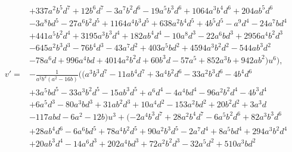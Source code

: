 \documentclass{gtpart}
\theoremstyle{definition}
\theoremstyle{remark}
\begin{document}
\begin{equation*}
\begin{split}
      & + 337 a^2 b^5 d^7 + 12 b^6 d^7 - 3 a^7 b^2 d^6 - 19 a^5 b^3 d^6 + 1064 a^3 b^4 d^6 + 204 a b^5 d^6 \\
      & - 3 a^8 b d^5 - 27 a^6 b^2 d^5 + 1164 a^4 b^3 d^5 + 638 a^2 b^4 d^5 + 4 b^5 d^5 - a^9 d^4 - 24 a^7 b d^4 \\
      & + 441 a^5 b^2 d^4 + 3195 a^3 b^3 d^4 + 182 a b^4 d^4 - 10 a^8 d^3 - 22 a^6 b d^3 + 2956 a^4 b^2 d^3 \\
      & - 645 a^2 b^3 d^3 - 76 b^4 d^3 - 43 a^7 d^2 + 403 a^5 b d^2 + 4594 a^3 b^2 d^2 - 544 a b^3 d^2 \\
      & - 78 a^6 d + 996 a^4 b d + 4014 a^2 b^2 d + 60 b^3 d - 57 a^5 + 852 a^3 b + 942 a b^2) u^6 \big), \\
 v' = & -\frac{1}{a^2 b^2 (a^2 - 16 b)} \big( (a^3 b^3 d^7 - 11 a b^4 d^7 + 3 a^4 b^2 d^6 - 33 a^2 b^3 d^6 - 4 b^4 d^6 \\
      & + 3 a^5 b d^5 - 33 a^3 b^2 d^5 - 15 a b^3 d^5 + a^6 d^4 - 4 a^4 b d^4 - 96 a^2 b^2 d^4 - 4 b^3 d^4 \\
      & + 6 a^5 d^3 - 80 a^3 b d^3 + 31 a b^2 d^3 + 10 a^4 d^2 - 153 a^2 b d^2 + 20 b^2 d^2 + 3 a^3 d \\
      & - 117 a b d - 6 a^2 - 12 b) u^3 + (-2 a^4 b^3 d^7 + 28 a^2 b^4 d^7 - 6 a^5 b^2 d^6 + 82 a^3 b^3 d^6 \\
      & + 28 a b^4 d^6 - 6 a^6 b d^5 + 78 a^4 b^2 d^5 + 90 a^2 b^3 d^5 - 2 a^7 d^4 + 8 a^5 b d^4 + 294 a^3 b^2 d^4 \\
      & + 20 a b^3 d^4 - 14 a^6 d^3 + 202 a^4 b d^3 + 72 a^2 b^2 d^3 - 32 a^5 d^2 + 510 a^3 b d^2 
\end{split}
\end{equation*}
\end{document}
